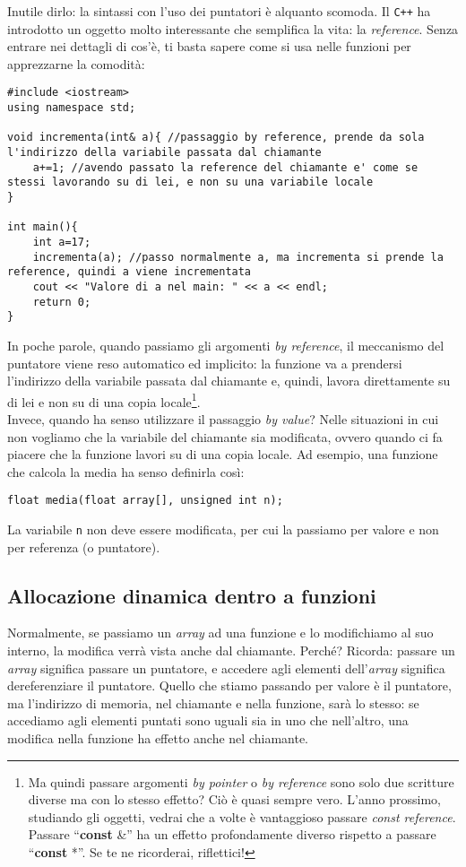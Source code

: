 Inutile dirlo: la sintassi con l'uso dei puntatori è alquanto scomoda. Il \verb|C++| ha introdotto un oggetto molto interessante che semplifica la vita: la \emph{reference}. Senza entrare nei dettagli di cos'è, ti basta sapere come si usa nelle funzioni per apprezzarne la comodità:
\begin{lstlisting}
#include <iostream>
using namespace std;

void incrementa(int& a){ //passaggio by reference, prende da sola l'indirizzo della variabile passata dal chiamante
	a+=1; //avendo passato la reference del chiamante e' come se stessi lavorando su di lei, e non su una variabile locale
}

int main(){
	int a=17;
	incrementa(a); //passo normalmente a, ma incrementa si prende la reference, quindi a viene incrementata
	cout << "Valore di a nel main: " << a << endl;
	return 0;
}
\end{lstlisting}

In poche parole, quando passiamo gli argomenti \emph{by reference}, il meccanismo del puntatore viene reso automatico ed implicito: la funzione va a prendersi l'indirizzo della variabile passata dal chiamante e, quindi, lavora direttamente su di lei e non su di una copia locale\footnote{Ma quindi passare argomenti \emph{by pointer} o \emph{by reference} sono solo due scritture diverse ma con lo stesso effetto? Ciò è quasi sempre vero. L'anno prossimo, studiando gli oggetti, vedrai che a volte è vantaggioso passare \emph{const reference}. Passare ``\textbf{const} \&'' ha un effetto profondamente diverso rispetto a passare ``\textbf{const} *''. Se te ne ricorderai, riflettici!}.\\


Invece, quando ha senso utilizzare il passaggio \emph{by value}? Nelle situazioni in cui non vogliamo che la variabile del chiamante sia modificata, ovvero quando ci fa piacere che la funzione lavori su di una copia locale. Ad esempio, una funzione che calcola la media ha senso definirla così:
\begin{lstlisting}
float media(float array[], unsigned int n);
\end{lstlisting}

La variabile \verb|n| non deve essere modificata, per cui la  passiamo per valore e non per referenza (o puntatore).
\subsection{Allocazione dinamica dentro a funzioni}
Normalmente, se passiamo un \emph{array} ad una funzione e lo modifichiamo al suo interno, la modifica verrà vista anche dal chiamante. Perché? Ricorda: passare un \emph{array} significa passare un puntatore, e accedere agli elementi dell'\emph{array} significa dereferenziare il puntatore. Quello che stiamo passando per valore è il puntatore, ma l'indirizzo di memoria, nel chiamante e nella funzione, sarà lo stesso: se accediamo agli elementi puntati sono uguali sia in uno che nell'altro, una modifica nella funzione ha effetto anche nel chiamante. 

